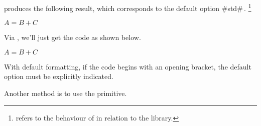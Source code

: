 \documentclass[10pt, a4paper]{tutodoc}
\begin{document}


\begin{tdocexa}[Following]
     produces the following result, which corresponds to the default option \tdocinlatex#std#\,.
    \footnote{
         refers to the  behaviour of  in relation to the  library.
    }

    \begin{tdoclatex}
        $A = B + C$
    \end{tdoclatex}
\end{tdocexa}




\begin{tdocexa}
    Via , we'll just get the code as shown below.

    \begin{tdoclatex}[code]
        $A = B + C$
    \end{tdoclatex}
\end{tdocexa}




\begin{tdocwarn}
    With default formatting, if the code begins with an opening bracket, the default option must be explicitly indicated.

    \smallskip

    Another method is to use the  primitive.
\end{tdocwarn}
\end{document}
